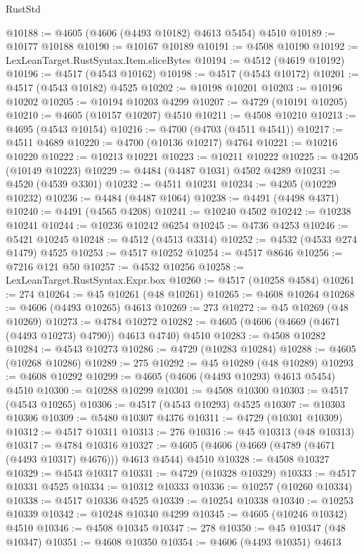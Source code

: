 \begin{lexlean}{RustStd}
\begin{coremodule}
@10188 := @4605 (@4606 (@4493 @10182) @4613 @5454) @4510
@10189 := @10177 @10188
@10190 := @10167 @10189
@10191 := @4508 @10190
@10192 := LexLeanTarget.RustSyntax.Item.sliceBytes
@10194 := @4512 (@4619 @10192)
@10196 := @4517 (@4543 @10162)
@10198 := @4517 (@4543 @10172)
@10201 := @4517 (@4543 @10182) @4525
@10202 := @10198 @10201
@10203 := @10196 @10202
@10205 := @10194 @10203 @4299
@10207 := @4729 (@10191 @10205)
@10210 := @4605 (@10157 @10207) @4510
@10211 := @4508 @10210
@10213 := @4695 (@4543 @10154)
@10216 := @4700 (@4703 (@4511 @4541))
@10217 := @4511 @4689
@10220 := @4700 (@10136 @10217) @4764
@10221 := @10216 @10220
@10222 := @10213 @10221
@10223 := @10211 @10222
@10225 := @4205 (@10149 @10223)
@10229 := @4484 (@4487 @1031) @4502 @4289
@10231 := @4520 (@4539 @3301)
@10232 := @4511 @10231
@10234 := @4205 (@10229 @10232)
@10236 := @4484 (@4487 @1064)
@10238 := @4491 (@4498 @4371)
@10240 := @4491 (@4565 @4208)
@10241 := @10240 @4502
@10242 := @10238 @10241
@10244 := @10236 @10242 @6254
@10245 := @4736 @4253
@10246 := @5421 @10245
@10248 := @4512 (@4513 @3314)
@10252 := @4532 (@4533 @274 @1479) @4525
@10253 := @4517 @10252
@10254 := @4517 @8646
@10256 := @7216 @121 @50
@10257 := @4532 @10256
@10258 := LexLeanTarget.RustSyntax.Expr.box
@10260 := @4517 (@10258 @4584)
@10261 := 274
@10264 := @45 @10261 (@48 @10261)
@10265 := @4608 @10264
@10268 := @4606 (@4493 @10265) @4613
@10269 := 273
@10272 := @45 @10269 (@48 @10269)
@10273 := @4784 @10272
@10282 := @4605 (@4606 (@4669 (@4671 (@4493 @10273) @4790)) @4613 @4740) @4510
@10283 := @4508 @10282
@10284 := @4543 @10273
@10286 := @4729 (@10283 @10284)
@10288 := @4605 (@10268 @10286)
@10289 := 275
@10292 := @45 @10289 (@48 @10289)
@10293 := @4608 @10292
@10299 := @4605 (@4606 (@4493 @10293) @4613 @5454) @4510
@10300 := @10288 @10299
@10301 := @4508 @10300
@10303 := @4517 (@4543 @10265)
@10306 := @4517 (@4543 @10293) @4525
@10307 := @10303 @10306
@10309 := @5480 @10307 @4376
@10311 := @4729 (@10301 @10309)
@10312 := @4517 @10311
@10313 := 276
@10316 := @45 @10313 (@48 @10313)
@10317 := @4784 @10316
@10327 := @4605 (@4606 (@4669 (@4789 (@4671 (@4493 @10317) @4676))) @4613 @4544) @4510
@10328 := @4508 @10327
@10329 := @4543 @10317
@10331 := @4729 (@10328 @10329)
@10333 := @4517 @10331 @4525
@10334 := @10312 @10333
@10336 := @10257 (@10260 @10334)
@10338 := @4517 @10336 @4525
@10339 := @10254 @10338
@10340 := @10253 @10339
@10342 := @10248 @10340 @4299
@10345 := @4605 (@10246 @10342) @4510
@10346 := @4508 @10345
@10347 := 278
@10350 := @45 @10347 (@48 @10347)
@10351 := @4608 @10350
@10354 := @4606 (@4493 @10351) @4613

\end{coremodule}
\end{lexlean}
